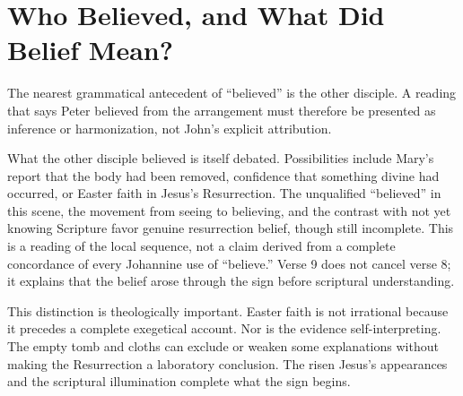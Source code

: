 \section{Who Believed, and What Did Belief Mean?}

The nearest grammatical antecedent of ``believed'' is the other disciple. A
reading that says Peter believed from the arrangement must therefore be
presented as inference or harmonization, not John's explicit attribution.

What the other disciple believed is itself debated. Possibilities include
Mary's report that the body had been removed, confidence that something divine
had occurred, or Easter faith in Jesus's Resurrection. The unqualified
``believed'' in this scene, the movement from seeing to believing, and the
contrast with not yet knowing Scripture favor genuine resurrection belief,
though still incomplete. This is a reading of the local sequence, not a claim
derived from a complete concordance of every Johannine use of ``believe.''
Verse 9 does not cancel verse 8; it explains that the belief arose through the
sign before scriptural understanding.

This distinction is theologically important. Easter faith is not irrational
because it precedes a complete exegetical account. Nor is the evidence
self-interpreting. The empty tomb and cloths can exclude or weaken some
explanations without making the Resurrection a laboratory conclusion. The
risen Jesus's appearances and the scriptural illumination complete what the
sign begins.

